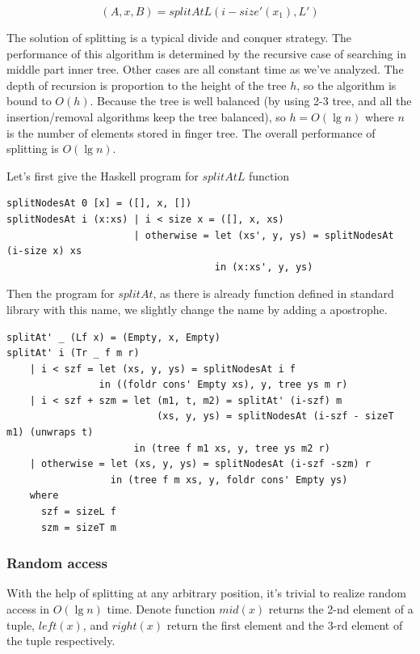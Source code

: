 \documentclass[b5paper]{article}
\begin{document}
\[
(A, x, B) = splitAtL(i-size'(x_1), L')
\]

The solution of splitting is a typical divide and conquer strategy. The performance
of this algorithm is determined by the recursive case of searching in middle part
inner tree. Other cases are all constant time as we've analyzed. The depth of
recursion is proportion to the height of the tree $h$, so the algorithm is bound
to $O(h)$. Because the tree is well balanced (by using 2-3 tree, and all the
insertion/removal algorithms keep the tree balanced), so $h = O(\lg n)$ where
$n$ is the number of elements stored in finger tree. The overall performance
of splitting is $O(\lg n)$.

Let's first give the Haskell program for $splitAtL$ function

\lstset{language=Haskell}
\begin{lstlisting}
splitNodesAt 0 [x] = ([], x, [])
splitNodesAt i (x:xs) | i < size x = ([], x, xs)
                      | otherwise = let (xs', y, ys) = splitNodesAt (i-size x) xs
                                    in (x:xs', y, ys)
\end{lstlisting}

Then the program for $splitAt$, as there is already function defined in standard
library with this name, we slightly change the name by adding a apostrophe.

\begin{lstlisting}
splitAt' _ (Lf x) = (Empty, x, Empty)
splitAt' i (Tr _ f m r)
    | i < szf = let (xs, y, ys) = splitNodesAt i f
                in ((foldr cons' Empty xs), y, tree ys m r)
    | i < szf + szm = let (m1, t, m2) = splitAt' (i-szf) m
                          (xs, y, ys) = splitNodesAt (i-szf - sizeT m1) (unwraps t)
                      in (tree f m1 xs, y, tree ys m2 r)
    | otherwise = let (xs, y, ys) = splitNodesAt (i-szf -szm) r
                  in (tree f m xs, y, foldr cons' Empty ys)
    where
      szf = sizeL f
      szm = sizeT m
\end{lstlisting}

\subsubsection{Random access}

With the help of splitting at any arbitrary position, it's trivial to realize random
access in $O(\lg n)$ time. Denote function $mid(x)$ returns the 2-nd element of a tuple,
$left(x)$, and $right(x)$ return the first element and the 3-rd element of the tuple
respectively.
\end{document}
